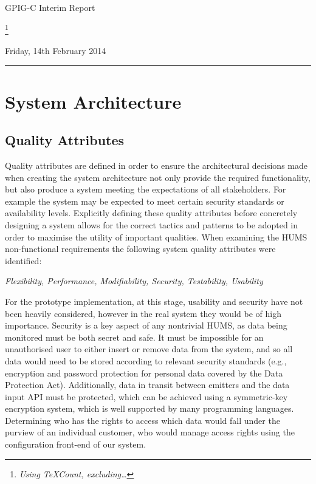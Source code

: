 \documentclass[10pt,a4paper]{article}
\begin{document}
\begin{center}
{\Large GPIG-C Interim Report}

\footnote{\textit{Using TeXCount, excluding\ldots}}

Friday, 14th February 2014
\end{center}

\vspace{0.3cm}
\rule{\textwidth}{0.4pt}




\section{System Architecture}
\label{sec:architecture}

\subsection{Quality Attributes}
\label{sec:architecture-quality}

Quality attributes are defined in order to ensure the architectural decisions 
made when creating the system architecture not only provide the required 
functionality, but also produce a system meeting the expectations of all 
stakeholders. For example the system may be expected to meet certain 
security standards or availability levels. Explicitly defining these quality 
attributes before concretely designing a system allows for the correct 
tactics and patterns to be adopted in order to maximise the utility of important 
qualities. When examining the HUMS non-functional requirements the 
following system quality attributes were identified:
	\begin{center}
	\textit{Flexibility, Performance, Modifiability, Security, 
Testability, Usability}
	\end{center}
For the prototype implementation, at this stage, usability and security 
have not been heavily considered, however in the real system they 
would be of high importance. Security is a key aspect of any nontrivial HUMS, 
as data being monitored must be both secret and safe. It must be impossible 
for an unauthorised user to either insert or remove data from the system, and 
so all data would need to be stored according to relevant security standards 
(e.g., encryption and password protection for personal data covered by the 
Data Protection Act). Additionally, data in transit between emitters and the data 
input API must be protected, which can be achieved using a symmetric-key 
encryption system, which is well supported by many programming languages. 
Determining who has the rights to access which data would fall under the 
purview of an individual customer, who would manage access rights using the 
configuration front-end of our system.
\end{document}
